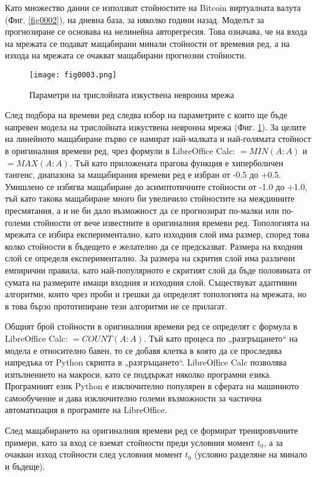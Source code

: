 Като множество данни се използват стойностите на Bitcoin виртуалната валута (Фиг. \ref{fig0002}), на дневна база, за няколко години назад. Моделът за прогнозиране се основава на нелинейна авторегресия. Това означава, че на входа на мрежата се подават мащабирани минали стойности от времевия ред, а на изхода на мрежата се очакват мащабирани прогнозни стойности. 

\begin{figure}[H]
  \centering
  \texttt{[image: fig0003.png]}
  \caption{Параметри на трислойната изкуствена невронна мрежа}
\label{fig0003}
\end{figure}

След подбора на времеви ред следва избор на параметрите с които ще бъде напревен модела на трислойната изкуствена невронна мрежа (Фиг. \ref{fig0003}). За целите на линейното мащабиране първо се намират най-малката и най-голямата стойност в оригиналния времеви ред, чрез формули в LibreOffice Calc: $=MIN(A:A)$ и $=MAX(A:A)$. Тъй като приложената прагова функция е хиперболичен тангенс, диапазона за мащабирания времеви ред е избран от -0.5 до +0.5. Умишлено се избягва мащабиране до асимптотичните стойности от -1.0 до +1.0, тъй като такова мащабиране много би увеличило стойностите на междинните пресмятания, а и не би дало възможност да се прогнозират по-малки или по-големи стойности от вече известните в оригиналния времеви ред. Топологията на мрежата се избира експериментално, като изходния слой има размер, според това колко стойности в бъдещето е желателно да се предсказват. Размера на входния слой се определя експериментално. За размера на скрития слой има различни емпирични правила, като най-популярното е скритият слой да бъде половината от сумата на размерите имащи входния и изходния слой. Съществуват адаптивни алгоритми, които чрез проби и грешки да определят топологията на мрежата, но в това бързо прототипиране тези алгоритми не се прилагат. 

Общият брой стойности в оригиналния времеви ред се определят с формула в LibreOffice Calc: $=COUNT(A:A)$. Тъй като процеса по „разгръщането“ на модела е относително бавен, то се добавя клетка в която да се проследява напредъка от Python скрипта в „разгръщането“. LibreOffice Calc позволява изпълнението на макроси, като се поддържат няколко програмни езика. Програмният език Python е изключително популярен в сферата на машинното самообучение и дава изключително големи възможности за частична автоматизация в програмите на LibreOffice.

След мащабирането на оригиналния времеви ред се формират тренировъчните примери, като за вход се вземат стойности преди условния момент $t_0$, а за очакван изход стойности след условния момент $t_0$ (условно разделяне на минало и бъдеще).

